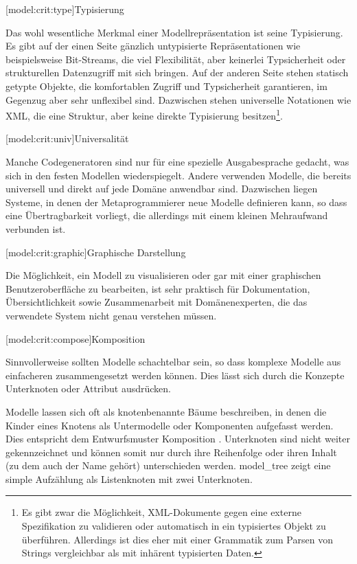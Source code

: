\documentclass[12pt, a4paper, bibgerm]{scrbook}
\newcommand\lsubsection{}
\newcommand\abb{}
\begin{document}
\lsubsection[model:crit:type]{Typisierung}

Das wohl wesentliche Merkmal einer Modellrepräsentation ist seine
Typisierung. Es gibt auf der einen Seite gänzlich untypisierte
Repräsentationen wie beispielsweise Bit-Streams, die viel Flexibilität,
aber keinerlei Typsicherheit oder strukturellen Datenzugriff mit sich
bringen. Auf der anderen Seite stehen statisch getypte Objekte, die
komfortablen Zugriff und Typsicherheit garantieren, im Gegenzug aber
sehr unflexibel sind. Dazwischen stehen universelle Notationen wie XML,
die eine Struktur, aber keine direkte Typisierung besitzen\footnote{Es
  gibt zwar die Möglichkeit, XML-Dokumente gegen eine externe
  Spezifikation zu validieren oder automatisch in ein typisiertes Objekt
zu überführen. Allerdings ist dies eher mit einer Grammatik
zum Parsen von Strings vergleichbar als mit inhärent typisierten Daten.}.

\lsubsection[model:crit:univ]{Universalität} 

Manche Codegeneratoren sind nur für eine spezielle Ausgabesprache
gedacht, was sich in den festen Modellen wiederspiegelt. Andere
verwenden Modelle, die bereits universell und direkt auf jede Domäne
anwendbar sind. Dazwischen liegen Systeme, in denen der
Metaprogrammierer neue Modelle definieren kann, so dass eine
Übertragbarkeit vorliegt, die allerdings mit einem kleinen Mehraufwand
verbunden ist.

\lsubsection[model:crit:graphic]{Graphische Darstellung}

Die Möglichkeit, ein Modell zu visualisieren oder gar mit einer
graphischen Benutzeroberfläche zu bearbeiten, ist sehr praktisch für
Dokumentation, Übersichtlichkeit sowie Zusammenarbeit mit
Domänenexperten, die das verwendete System nicht genau verstehen müssen.

\lsubsection[model:crit:compose]{Komposition}

Sinnvollerweise sollten Modelle schachtelbar sein, so dass
komplexe Modelle aus einfacheren zusammengesetzt werden können.
Dies lässt sich durch die Konzepte Unterknoten oder Attribut ausdrücken.

Modelle lassen sich oft als knotenbenannte Bäume beschreiben, in denen
die Kinder eines Knotens als Untermodelle oder Komponenten aufgefasst
werden. Dies entspricht dem Entwurfsmuster
Komposition \cite[S.182f]{CompositePattern}. Unterknoten sind nicht
weiter gekennzeichnet und können somit nur durch ihre Reihenfolge oder
ihren Inhalt (zu dem auch der Name gehört) unterschieden
werden. \abb{model_tree} zeigt eine simple Aufzählung als
Listenknoten mit zwei Unterknoten.
\end{document}

